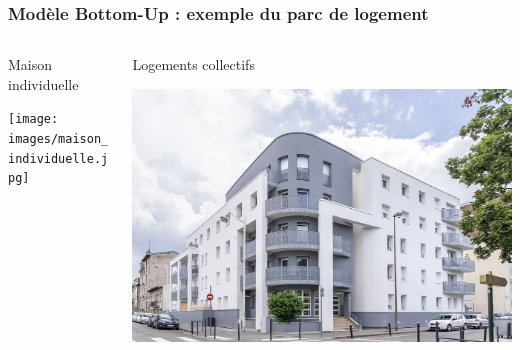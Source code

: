 \documentclass{beamer}
\begin{document}
\begin{frame}
\frametitle{Modèle Bottom-Up : exemple du parc de logement}
\vspace{0,5cm}
\begin{columns}
  \begin{column}{0.5\textwidth}
Maison individuelle 

  \texttt{[image: images/maison\_individuelle.jpg]}
\end{column}
\begin{column}{0.5\textwidth}
Logements collectifs

  \includegraphics[scale=0.12]{images/batiment_collectif.jpg}
\end{column}
\end{columns}


\end{frame}
\end{document}
